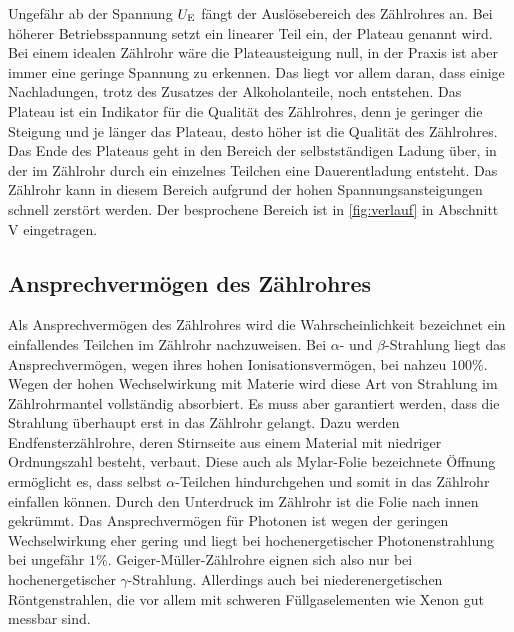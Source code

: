 Ungefähr ab der Spannung $U_\text E$ fängt der Auslösebereich des Zählrohres an. Bei höherer Betriebsspannung setzt ein linearer Teil ein, der Plateau genannt wird. Bei einem idealen Zählrohr wäre die Plateausteigung null, in der Praxis ist aber immer eine geringe Spannung zu erkennen.
Das liegt vor allem daran, dass einige Nachladungen, trotz des Zusatzes der Alkoholanteile, noch entstehen. Das Plateau ist ein Indikator für die Qualität des Zählrohres, denn je geringer die Steigung und je länger das Plateau, desto höher ist die Qualität des Zählrohres.
Das Ende des Plateaus geht in den Bereich der selbstständigen Ladung über, in der im Zählrohr durch ein einzelnes Teilchen eine Dauerentladung entsteht. Das Zählrohr kann in diesem Bereich aufgrund der hohen Spannungsansteigungen schnell zerstört werden.
Der besprochene Bereich ist in \autoref{fig:verlauf} in Abschnitt \RN{5} eingetragen.

\subsection{Ansprechvermögen des Zählrohres}
\label{subsec:Ansprechvermoegen}

Als Ansprechvermögen des Zählrohres wird die Wahrscheinlichkeit bezeichnet ein einfallendes Teilchen im Zählrohr nachzuweisen. Bei $\alpha$- und $\beta$-Strahlung liegt das Ansprechvermögen, wegen ihres hohen Ionisationsvermögen, bei nahzeu $100 \%$.
Wegen der hohen Wechselwirkung mit Materie wird diese Art von Strahlung im Zählrohrmantel vollständig absorbiert. Es muss aber garantiert werden, dass die Strahlung überhaupt erst in das Zählrohr gelangt. Dazu werden Endfensterzählrohre, deren Stirnseite aus einem
Material mit niedriger Ordnungszahl besteht, verbaut. Diese auch als Mylar-Folie bezeichnete Öffnung ermöglicht es, dass selbst $\alpha$-Teilchen hindurchgehen und somit in das Zählrohr einfallen können. Durch den Unterdruck im Zählrohr ist die Folie nach innen gekrümmt. \newline
Das Ansprechvermögen für Photonen ist wegen der geringen Wechselwirkung eher gering und liegt bei hochenergetischer Photonenstrahlung bei ungefähr $1 \%$. Geiger-Müller-Zählrohre eignen sich also nur bei hochenergetischer $\gamma$-Strahlung. Allerdings auch bei niederenergetischen Röntgenstrahlen, die vor allem mit schweren Füllgaselementen
wie Xenon gut messbar sind.